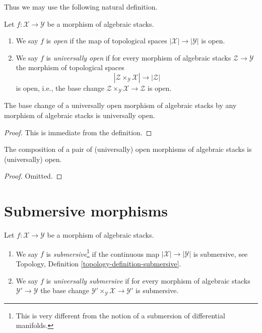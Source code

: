\noindent
Thus we may use the following natural definition.

\begin{definition}
\label{definition-open}
Let $f : \mathcal{X} \to \mathcal{Y}$ be a morphism of algebraic stacks.
\begin{enumerate}
\item We say $f$ is {\it open} if the map of topological
spaces $|\mathcal{X}| \to |\mathcal{Y}|$ is open.
\item We say $f$ is {\it universally open} if for every morphism
of algebraic stacks $\mathcal{Z} \to \mathcal{Y}$
the morphism of topological spaces
$$
|\mathcal{Z} \times_\mathcal{Y} \mathcal{X}| \to |\mathcal{Z}|
$$
is open, i.e., the base change
$\mathcal{Z} \times_\mathcal{Y} \mathcal{X} \to \mathcal{Z}$ is open.
\end{enumerate}
\end{definition}

\begin{lemma}
\label{lemma-base-change-universally-open}
The base change of a universally open morphism of algebraic stacks
by any morphism of algebraic stacks is universally open.
\end{lemma}

\begin{proof}
This is immediate from the definition.
\end{proof}

\begin{lemma}
\label{lemma-composition-universally-open}
The composition of a pair of (universally) open morphisms of
algebraic stacks is (universally) open.
\end{lemma}

\begin{proof}
Omitted.
\end{proof}







\section{Submersive morphisms}
\label{section-submersive}

\begin{definition}
\label{definition-submersive}
Let $f : \mathcal{X} \to \mathcal{Y}$ be a morphism of algebraic stacks.
\begin{enumerate}
\item We say $f$ is {\it submersive}\footnote{This is very different
from the notion of a submersion of differential manifolds.}
if the continuous map $|\mathcal{X}| \to |\mathcal{Y}|$ is submersive, see
Topology, Definition \ref{topology-definition-submersive}.
\item We say $f$ is {\it universally submersive} if for every
morphism of algebraic stacks $\mathcal{Y}' \to \mathcal{Y}$
the base change $\mathcal{Y}' \times_\mathcal{Y} \mathcal{X} \to \mathcal{Y}'$
is submersive.
\end{enumerate}
\end{definition}

